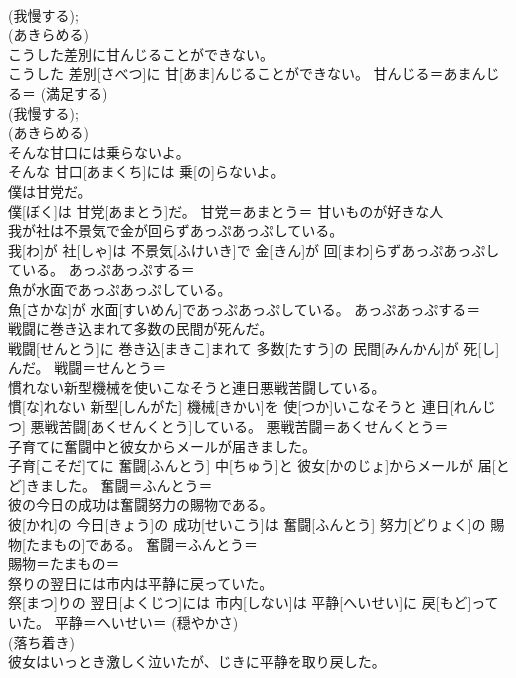 \documentclass[8pt]{extreport}
\begin{document}
\begin{CJK}{UTF8}{min}
{\\	(我慢する); 
\\	(あきらめる)
\\	こうした差別に甘んじることができない。	
\\	こうした 差別[さべつ]に 甘[あま]んじることができない。	甘んじる＝あまんじる＝ (満足する) 
\\	(我慢する); 
\\	(あきらめる)
\\	そんな甘口には乗らないよ。	
\\	そんな 甘口[あまくち]には 乗[の]らないよ。	
\\	僕は甘党だ。	
\\	僕[ぼく]は 甘党[あまとう]だ。	甘党＝あまとう＝ 甘いものが好きな人
\\	我が社は不景気で金が回らずあっぷあっぷしている。	
\\	我[わ]が 社[しゃ]は 不景気[ふけいき]で 金[きん]が 回[まわ]らずあっぷあっぷしている。	あっぷあっぷする＝ 
\\	魚が水面であっぷあっぷしている。	
\\	魚[さかな]が 水面[すいめん]であっぷあっぷしている。	あっぷあっぷする＝ 
\\	戦闘に巻き込まれて多数の民間が死んだ。	
\\	戦闘[せんとう]に 巻き込[まきこ]まれて 多数[たすう]の 民間[みんかん]が 死[し]んだ。	戦闘＝せんとう＝ 
\\	慣れない新型機械を使いこなそうと連日悪戦苦闘している。	
\\	慣[な]れない 新型[しんがた] 機械[きかい]を 使[つか]いこなそうと 連日[れんじつ] 悪戦苦闘[あくせんくとう]している。	悪戦苦闘＝あくせんくとう＝ 
\\	子育てに奮闘中と彼女からメールが届きました。	
\\	子育[こそだ]てに 奮闘[ふんとう] 中[ちゅう]と 彼女[かのじょ]からメールが 届[とど]きました。	奮闘＝ふんとう＝ 
\\	彼の今日の成功は奮闘努力の賜物である。	
\\	彼[かれ]の 今日[きょう]の 成功[せいこう]は 奮闘[ふんとう] 努力[どりょく]の 賜物[たまもの]である。	奮闘＝ふんとう＝ 
\\	賜物＝たまもの＝ 
\\	祭りの翌日には市内は平静に戻っていた。	
\\	祭[まつ]りの 翌日[よくじつ]には 市内[しない]は 平静[へいせい]に 戻[もど]っていた。	平静＝へいせい＝ (穏やかさ) 
\\	(落ち着き) 
\\	彼女はいっとき激しく泣いたが、じきに平静を取り戻した。	
}
\end{CJK}
\end{document}
